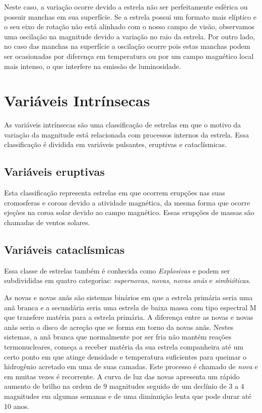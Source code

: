  Neste caso, a variação ocorre devido a estrela não ser perfeitamente esférica ou possuir manchas em sua superfície. Se a estrela possui um formato mais elíptico e o seu eixo de rotação não está alinhado com o nosso campo de visão, observamos uma oscilação na magnitude devido a variação no raio da estrela. Por outro lado, no caso das manchas na superfície a oscilação ocorre pois estas manchas podem ser ocasionadas por diferença em temperatura ou por um campo magnético local mais intenso, o que interfere na emissão de luminosidade.


\section{Variáveis Intrínsecas}

As variáveis intrínsecas são uma classificação de estrelas em que o motivo da variação da magnitude está relacionada com processos internos da estrela. Essa classificação é dividida em variáveis pulsantes, eruptivas e cataclísmicas.

\subsection{Variáveis eruptivas}

Esta classificação representa estrelas em que ocorrem erupções nas suas cromosferas e coroas devido a atividade magnética, da mesma forma que ocorre ejeções na coroa solar devido ao campo magnético. Essas erupções de massas são chamadas de ventos solares.

\subsection{Variáveis cataclísmicas}

Essa classe de estrelas também é conhecida como \textit{Explosivas} e podem ser subdivididas em quatro categorias: \textit{supernovas}, \textit{novas}, \textit{novas anãs} e \textit{simbióticas}.

As novas e novas anãs são sistemas binários em que a estrela primária seria uma anã branca e a secundária seria uma estrela de baixa massa com tipo espectral M que transfere matéria para a estrela primária. A diferença entre as novas e novas anãs seria o disco de acreção que se forma em torno da novas anãs. Nestes sistemas, a anã branca que normalmente por ser fria não mantém reações termonucleares, começa a receber matéria da sua estrela companheira até um certo ponto em que atinge densidade e temperatura suficientes para queimar o hidrogênio acretado em uma de suas camadas. Este processo é chamado de \textit{nova} e em muitas vezes é recorrente. A curva de luz das novas apresenta um rápido aumento de brilho na ordem de 9 magnitudes seguido de um declínio de 3 a 4 magnitudes em algumas semanas e de uma diminuição lenta que pode durar até 10 anos.

